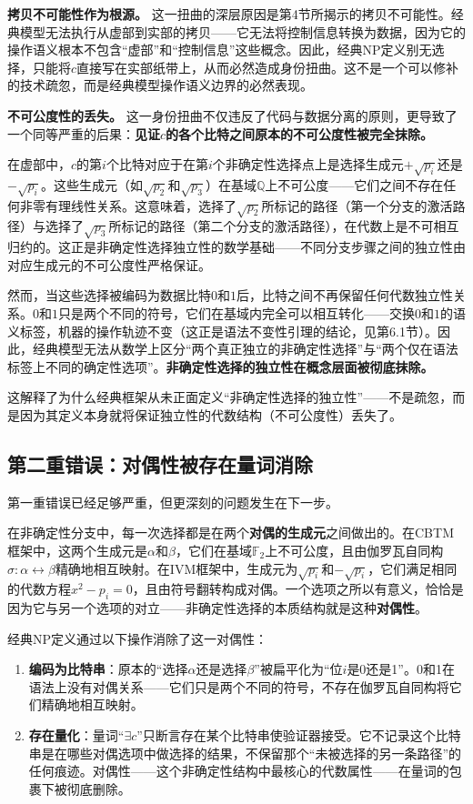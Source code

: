 \documentclass{ctexart}
\begin{document}
	\textbf{拷贝不可能性作为根源。} 这一扭曲的深层原因是第4节所揭示的拷贝不可能性。经典模型无法执行从虚部到实部的拷贝——它无法将控制信息转换为数据，因为它的操作语义根本不包含``虚部''和``控制信息''这些概念。因此，经典NP定义别无选择，只能将$c$直接写在实部纸带上，从而必然造成身份扭曲。这不是一个可以修补的技术疏忽，而是经典模型操作语义边界的必然表现。
	
	\textbf{不可公度性的丢失。} 这一身份扭曲不仅违反了代码与数据分离的原则，更导致了一个同等严重的后果：\textbf{见证$c$的各个比特之间原本的不可公度性被完全抹除。}
	
	在虚部中，$c$的第$i$个比特对应于在第$i$个非确定性选择点上是选择生成元$+\sqrt{p_i}$还是$-\sqrt{p_i}$。这些生成元（如$\sqrt{p_2}$和$\sqrt{p_3}$）在基域$\mathbb{Q}$上不可公度——它们之间不存在任何非零有理线性关系。这意味着，选择了$\sqrt{p_2}$所标记的路径（第一个分支的激活路径）与选择了$\sqrt{p_3}$所标记的路径（第二个分支的激活路径），在代数上是不可相互归约的。这正是非确定性选择独立性的数学基础——不同分支步骤之间的独立性由对应生成元的不可公度性严格保证。
	
	然而，当这些选择被编码为数据比特$0$和$1$后，比特之间不再保留任何代数独立性关系。$0$和$1$只是两个不同的符号，它们在基域内完全可以相互转化——交换$0$和$1$的语义标签，机器的操作轨迹不变（这正是语法不变性引理的结论，见第6.1节）。因此，经典模型无法从数学上区分``两个真正独立的非确定性选择''与``两个仅在语法标签上不同的确定性选项''。\textbf{非确定性选择的独立性在概念层面被彻底抹除。}
	
	这解释了为什么经典框架从未正面定义``非确定性选择的独立性''——不是疏忽，而是因为其定义本身就将保证独立性的代数结构（不可公度性）丢失了。
	
	\subsection{第二重错误：对偶性被存在量词消除}
	
	第一重错误已经足够严重，但更深刻的问题发生在下一步。
	
	在非确定性分支中，每一次选择都是在两个\textbf{对偶的生成元}之间做出的。在CBTM框架中，这两个生成元是$\alpha$和$\beta$，它们在基域$\mathbb{F}_2$上不可公度，且由伽罗瓦自同构$\sigma: \alpha \leftrightarrow \beta$精确地相互映射。在IVM框架中，生成元为$\sqrt{p_i}$和$-\sqrt{p_i}$，它们满足相同的代数方程$x^2 - p_i = 0$，且由符号翻转构成对偶。一个选项之所以有意义，恰恰是因为它与另一个选项的对立——非确定性选择的本质结构就是这种\textbf{对偶性}。
	
	经典NP定义通过以下操作消除了这一对偶性：
	\begin{enumerate}
		\item \textbf{编码为比特串}：原本的``选择$\alpha$还是选择$\beta$''被扁平化为``位$i$是0还是1''。0和1在语法上没有对偶关系——它们只是两个不同的符号，不存在伽罗瓦自同构将它们精确地相互映射。
		\item \textbf{存在量化}：量词``$\exists c$''只断言存在某个比特串使验证器接受。它不记录这个比特串是在哪些对偶选项中做选择的结果，不保留那个``未被选择的另一条路径''的任何痕迹。对偶性——这个非确定性结构中最核心的代数属性——在量词的包裹下被彻底删除。
	\end{enumerate}
	
\end{document}
